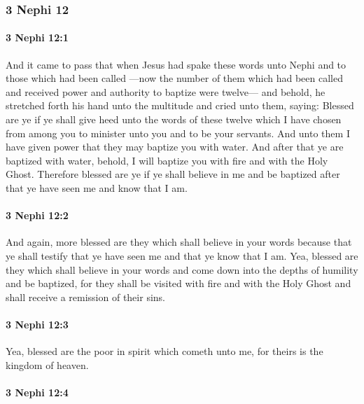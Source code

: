 	\subsubsection{3 Nephi 12} %
		\label{3NEPHI-12}
		
		\paragraph{3 Nephi 12:1} %
			\label{3NEPHI-12-1}

			And it came to pass that when Jesus had spake these words
			unto Nephi and to those which had been called
			---now the number of them which had been called
			and received power and authority to baptize were twelve---
			and behold, he stretched forth his hand unto the multitude
			and cried unto them, saying:
			Blessed are ye if ye shall give heed unto the words of these twelve
			which I have chosen from among you
			to minister unto you and to be your servants.
			And unto them I have given power
			that they may baptize you with water.
			And after that ye are baptized with water,
			behold, I will baptize you with fire and with the Holy Ghost.
			Therefore blessed are ye if ye shall believe in me and be baptized
			after that ye have seen me and know that I am.

		\paragraph{3 Nephi 12:2} %
			\label{3NEPHI-12-2}

			And again, more blessed are they which shall believe in your words
			because that ye shall testify that ye have seen me
			and that ye know that I am.
			Yea, blessed are they which shall believe in your words
			and come down into the depths of humility and be baptized,
			for they shall be visited with fire and with the Holy Ghost
			and shall receive a remission of their sins.

		\paragraph{3 Nephi 12:3} %
			\label{3NEPHI-12-3}

			Yea, blessed are the poor in spirit which cometh unto me,
			for theirs is the kingdom of heaven.

		\paragraph{3 Nephi 12:4} %
			\label{3NEPHI-12-4}

